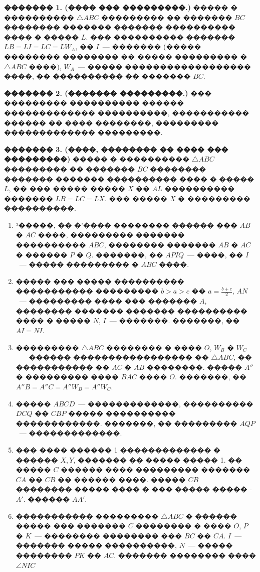 \documentclass[a4paper,12pt]{article}
\begin{document}
\quad \textbf{������� 1. (���� ��� ���������.)} ����� � ���������� $\triangle ABC$ ��������� �� ������� $BC$ �������� ������� ������� ���������� ���� � ����� $L$. ��� ���������� ������� $LB=LI=LC=LW_{A}$, �� $I$~--- ������� (����� �������� �������� �� ����� ��������� � $\triangle ABC$ ����), $W_{A}$~--- ����� ������������������ ����, �� ���������� �� ������� $BC$.

\textbf{������� 2. (������� ���������.)} ��� ��������� ���������� ������ ������������� ����������, ����������� ������ �� ���� ��������, ��������� ������������� ���������.

\textbf{������� 3. (����, �������� �� ���� ��� ���������)} ����� � ���������� $\triangle ABC$ ��������� �� ������� $BC$ �������� ������� ������� ���������� ���� � ����� $L$, �� ��� ����� ����� $X$ �� $AL$ ���������� ������� $LB=LC=LX$. ��� ����� $X$ � ��������� ����������.

\medskip\medskip\medskip

\begin{enumerate}
 \item ³�����, �� �'���� �������� ������ ��� $AB$ � $AC$ ����, ��������� ������� ���������� $ABC$, �������� ������� $AB$ � $AC$ � ������ $P$ � $Q$. �������, �� $APIQ$~--- ����, �� $I$~--- ����� ��������� � $ABC$ ����.

\item ����� ��� ����� ���������� ����������� ��������� $b>a>c$ �� $a=\frac{b+c}{2}$, $AN$~--- ��������� ���� ��� ������� $A$, �������� ������� ������� ���������� ���� � ����� $N$, $I$~--- �������. �������, �� $AI=NI$.

\item ��������� $\triangle ABC$ �������� � ���� $O$, $W_{B}$ � $W_{C}$~--- ������ ����������������� �� $\triangle ABC$, �� ����������� �� $AC$ � $AB$ ��������. ����� $A''$ � ��������� ���� $BAC$ ���� $O$. �������, �� $A''B=A''C=A''W_{B}=A''W_{C}$.

\item ����� $ABCD$~--- �������������, ���������� $DCQ$ �� $CBP$ ����� ���������� ������������. �������, �� ��������� $AQP$~--- �������������.

\item ��� ���� ������ 1 ������������� � ������ $X, Y$, ������� �� ����� ����� 1. �� ����� $C$ ������ ���� ��������� ������� $CA$ �� $CB$ �� ������ ����. ����� $CB$ �������� ����� ���� � ��� ����� ����� - $A'$. ������ $AA'$.

\item ����������� ��������� $\triangle ABC$ � ������ ����� ��� ������� $C$ �������� � ���� $O$, $P$ � $K$~--- �������� �������� ��� $BC$ �� $CA$. $I$~--- ������� ����� ����������, $N$~--- ����� �������� $PK$ �� $AC$. ������� �������� ���� $\angle NIC$
\end{enumerate}
\end{document}
